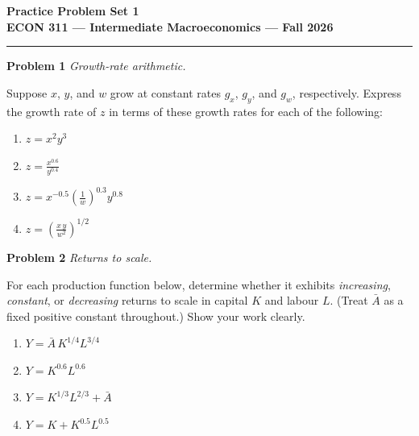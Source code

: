 \documentclass[12pt]{article}
\begin{document}
\begin{center}
  {\LARGE \textbf{Practice Problem Set 1}}\\[10pt]
  {\large \textbf{ECON 311 --- Intermediate Macroeconomics --- Fall 2026}}\\[6pt]

  
\end{center}

\bigskip


\bigskip\hrule\bigskip



\noindent\textbf{Problem 1} \quad \textit{Growth-rate arithmetic.}

\medskip
Suppose $x$, $y$, and $w$ grow at constant rates $g_x$, $g_y$, and $g_w$,
respectively.  Express the growth rate of $z$ in terms of these growth rates
for each of the following:

\begin{enumerate}[label=(\alph*),leftmargin=2em,itemsep=4pt]
  \item $\displaystyle z = x^{2} y^{3}$
  \item $\displaystyle z = \frac{x^{0.6}}{y^{0.4}}$
  \item $\displaystyle z = x^{-0.5}\left(\frac{1}{w}\right)^{0.3} y^{0.8}$
  \item $\displaystyle z = \left(\frac{x\,y}{w^{2}}\right)^{1/2}$
\end{enumerate}

\bigskip

\noindent\textbf{Problem 2} \quad \textit{Returns to scale.}

\medskip
For each production function below, determine whether it exhibits
\emph{increasing}, \emph{constant}, or \emph{decreasing} returns to scale
in capital $K$ and labour $L$.  (Treat $\bar{A}$ as a fixed positive
constant throughout.)  Show your work clearly.

\begin{enumerate}[label=(\alph*),leftmargin=2em,itemsep=4pt]
  \item $Y = \bar{A}\,K^{1/4}L^{3/4}$
  \item $Y = K^{0.6}L^{0.6}$
  \item $Y = K^{1/3}L^{2/3} + \bar{A}$
  \item $Y = K + K^{0.5}L^{0.5}$
\end{enumerate}
\end{document}

